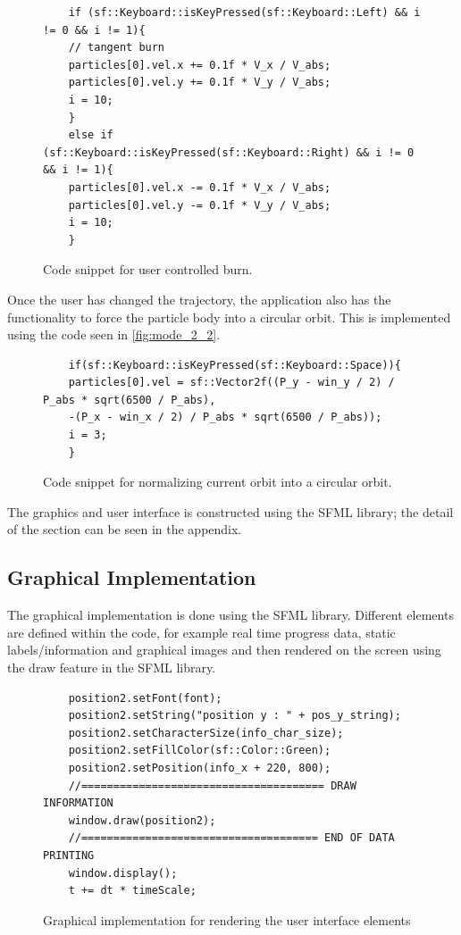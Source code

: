 \documentclass[12pt, letter]{article}
\begin{document}
\begin{figure}[H]
        \begin{verbatim}
    if (sf::Keyboard::isKeyPressed(sf::Keyboard::Left) && i != 0 && i != 1){
    // tangent burn
    particles[0].vel.x += 0.1f * V_x / V_abs;
    particles[0].vel.y += 0.1f * V_y / V_abs;
    i = 10;
    }
    else if (sf::Keyboard::isKeyPressed(sf::Keyboard::Right) && i != 0 && i != 1){
    particles[0].vel.x -= 0.1f * V_x / V_abs;
    particles[0].vel.y -= 0.1f * V_y / V_abs;
    i = 10;
    }
\end{verbatim}
\caption{Code snippet for user controlled burn.}
\label{fig:mode_2_1}
\end{figure}
\clearpage


Once the user has changed the trajectory, the application also has the functionality to force the particle body into a circular orbit. This is implemented using the code seen in \autoref{fig:mode_2_2}.
\begin{figure}[H]
        \begin{verbatim}
    if(sf::Keyboard::isKeyPressed(sf::Keyboard::Space)){
    particles[0].vel = sf::Vector2f((P_y - win_y / 2) / P_abs * sqrt(6500 / P_abs),
    -(P_x - win_x / 2) / P_abs * sqrt(6500 / P_abs));
    i = 3;
    }
\end{verbatim}
\caption{Code snippet for normalizing current orbit into a circular orbit.}
\label{fig:mode_2_2}
\end{figure}

The graphics and user interface is constructed using the SFML library; the detail of the section can be seen in the appendix.

 \subsection{Graphical Implementation}
 The graphical implementation is done using the SFML library. Different elements are defined within the code, for example real time progress data, static labels/information and graphical images and then rendered on the screen using the draw feature in the SFML library.

\begin{figure}[H]
        \begin{verbatim}
    position2.setFont(font);
    position2.setString("position y : " + pos_y_string);
    position2.setCharacterSize(info_char_size);
    position2.setFillColor(sf::Color::Green);
    position2.setPosition(info_x + 220, 800);
    //====================================== DRAW INFORMATION 
    window.draw(position2);
    //===================================== END OF DATA PRINTING 
    window.display();
    t += dt * timeScale;
\end{verbatim}
\caption{Graphical implementation for rendering the user interface elements}
\label{fig:window_display}
\end{figure}
\end{document}
